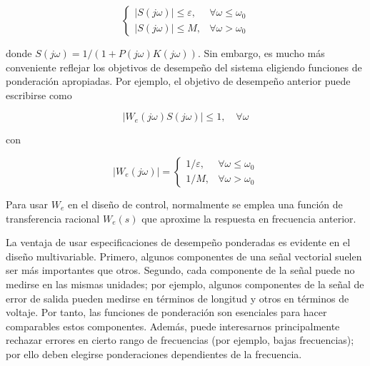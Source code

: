 $$
\begin{cases}|S(j \omega)| \leq \varepsilon, & \forall \omega \leq \omega_{0} \\ |S(j \omega)| \leq M, & \forall \omega>\omega_{0}\end{cases}
$$

donde $S(j \omega)=1 /(1+P(j \omega) K(j \omega))$. Sin embargo, es mucho más conveniente reflejar los objetivos de desempeño del sistema eligiendo funciones de ponderación apropiadas. Por ejemplo, el objetivo de desempeño anterior puede escribirse como

$$
\left|W_{e}(j \omega) S(j \omega)\right| \leq 1, \quad \forall \omega
$$

con

$$
\left|W_{e}(j \omega)\right|=\left\{\begin{array}{cc}
1 / \varepsilon, & \forall \omega \leq \omega_{0} \\
1 / M, & \forall \omega>\omega_{0}
\end{array}\right.
$$

Para usar $W_{e}$ en el diseño de control, normalmente se emplea una función de transferencia racional $W_{e}(s)$ que aproxime la respuesta en frecuencia anterior.

La ventaja de usar especificaciones de desempeño ponderadas es evidente en el diseño multivariable. Primero, algunos componentes de una señal vectorial suelen ser más importantes que otros. Segundo, cada componente de la señal puede no medirse en las mismas unidades; por ejemplo, algunos componentes de la señal de error de salida pueden medirse en términos de longitud y otros en términos de voltaje. Por tanto, las funciones de ponderación son esenciales para hacer comparables estos componentes. Además, puede interesarnos principalmente rechazar errores en cierto rango de frecuencias (por ejemplo, bajas frecuencias); por ello deben elegirse ponderaciones dependientes de la frecuencia.


